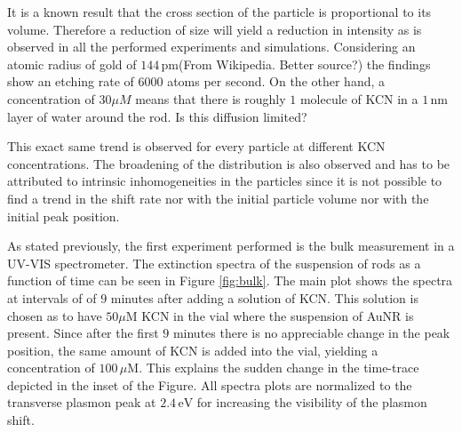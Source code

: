 \documentclass[twocolumn]{article}
\begin{document}
It is a known result that the cross section of the particle is proportional to
its volume. Therefore a reduction of size will yield a reduction in intensity
as is observed in all the performed experiments and simulations. Considering an
atomic radius of gold of $144\,\textrm{pm}$(From Wikipedia. Better source?) the
findings show an etching rate of $6000$ atoms per second. On the other hand, a
concentration of $30\mu M$ means that there is roughly $1$ molecule of KCN in a
$1\,\textrm{nm}$ layer of water around the rod. Is this diffusion limited? 



This exact same trend is observed for every particle at different KCN
concentrations. The broadening of the distribution is also observed and has to
be attributed to intrinsic inhomogeneities in the particles since it is not
possible to find a trend in the shift rate nor with the initial particle 
volume nor with the initial peak position. 



As stated previously, the first experiment performed is the bulk measurement in
a UV-VIS spectrometer. The extinction spectra of the suspension of rods as a
function of time can be seen in Figure \ref{fig:bulk}. The main plot shows the
spectra at intervals of of $9$ minutes after adding a solution of KCN. This
solution is chosen as to have $50\mu\textrm{M}$ KCN in the vial where the
suspension of AuNR is present. Since after the first $9$ minutes there is no appreciable
change in the peak position, the same amount of KCN is added into the vial,
yielding a concentration of $100\,\mu\textrm{M}$. This explains the sudden
change in the time-trace depicted in the inset of the Figure. All spectra plots are
normalized to the transverse plasmon peak at $2.4\,\textrm{eV}$ for increasing
the visibility of the plasmon shift.
\end{document}
